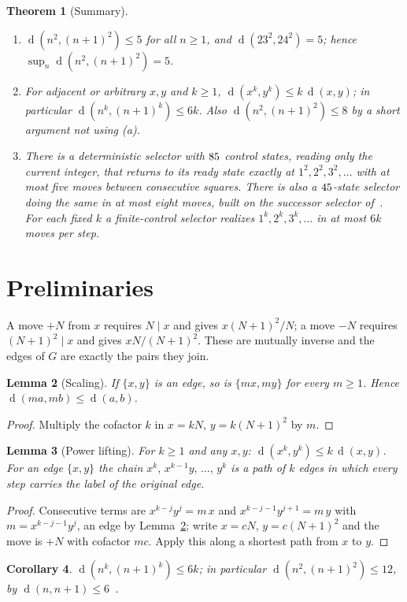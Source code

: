 \documentclass[11pt]{article}
\newtheorem{theorem}{Theorem}[section]
\newtheorem{lemma}[theorem]{Lemma}
\newtheorem{corollary}[theorem]{Corollary}
\theoremstyle{definition}
\newcommand{\dist}{\operatorname{d}}
\begin{document}
\begin{theorem}[Summary]\label{thm:summary}
\begin{enumerate}[label=(\alph*),nosep]
\item $\dist(n^2,(n+1)^2)\le5$ for all $n\ge1$, and $\dist(23^2,24^2)=5$; hence $\sup_n\dist(n^2,(n+1)^2)=5$.
\item For adjacent or arbitrary $x,y$ and $k\ge1$, $\dist(x^k,y^k)\le k\,\dist(x,y)$; in particular $\dist(n^k,(n+1)^k)\le6k$. Also $\dist(n^2,(n+1)^2)\le8$ by a short argument not using (a).
\item There is a deterministic selector with $85$ control states, reading only the current integer, that returns to its ready state exactly at $1^2,2^2,3^2,\dots$ with at most five moves between consecutive squares.
There is also a $45$-state selector doing the same in at most eight moves, built on the successor selector of~\cite{u2}. For each fixed $k$ a finite-control selector realizes $1^k,2^k,3^k,\dots$ in at most $6k$ moves per step.
\end{enumerate}
\end{theorem}

\section{Preliminaries}\label{sec:prelim}
A move $+N$ from $x$ requires $N\mid x$ and gives $x(N+1)^2/N$; a move $-N$ requires $(N+1)^2\mid x$ and gives $xN/(N+1)^2$. These are mutually inverse and the edges of $G$ are exactly the pairs they join.

\begin{lemma}[Scaling]\label{lem:scale}
If $\{x,y\}$ is an edge, so is $\{mx,my\}$ for every $m\ge1$. Hence $\dist(ma,mb)\le\dist(a,b)$.
\end{lemma}
\begin{proof} Multiply the cofactor $k$ in $x=kN$, $y=k(N+1)^2$ by $m$. \end{proof}

\begin{lemma}[Power lifting]\label{lem:lift}
For $k\ge1$ and any $x,y$: $\dist(x^k,y^k)\le k\,\dist(x,y)$. For an edge $\{x,y\}$ the chain
$x^k,\,x^{k-1}y,\,\dots,\,y^k$ is a path of $k$ edges in which every step carries the label of the original edge.
\end{lemma}
\begin{proof} Consecutive terms are $x^{k-j}y^{j}=m\,x$ and $x^{k-j-1}y^{j+1}=m\,y$ with $m=x^{k-j-1}y^j$, an edge by Lemma~\ref{lem:scale}; write $x=cN$, $y=c(N+1)^2$ and the move is $+N$ with cofactor $mc$.
Apply this along a shortest path from $x$ to $y$. \end{proof}
\begin{corollary}\label{cor:6k} $\dist(n^k,(n+1)^k)\le 6k$; in particular $\dist(n^2,(n+1)^2)\le12$, by $\dist(n,n+1)\le6$~\cite{u1bnd}. \end{corollary}
\end{document}
